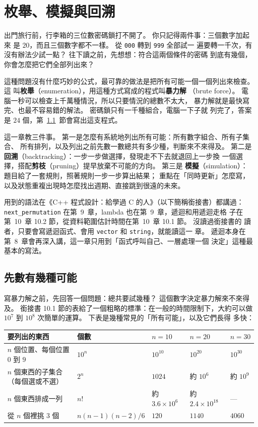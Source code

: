 \chapter{枚舉、模擬與回溯}
\label{ch:enumeration}

出門旅行前，行李箱的三位數密碼鎖打不開了。 你只記得兩件事：三個數字加起來
是 $20$，而且三個數字都不一樣。 從 \texttt{000} 轉到 \texttt{999} 全部試一
遍要轉一千次，有沒有辦法少試一點？ 往下讀之前，先想想：符合這兩個條件的密碼
到底有幾個，你會怎麼把它們全部列出來？

這種問題沒有什麼巧妙的公式，最可靠的做法是把所有可能一個一個列出來檢查。 這
叫\textbf{枚舉}（enumeration），用這種方式寫成的程式叫\textbf{暴力解}
（brute force）。 電腦一秒可以檢查上千萬種情況，所以只要情況的總數不太大，
暴力解就是最快寫完、也最不容易錯的解法。 密碼鎖只有一千種組合，電腦一下子就
列完了，答案是 $24$ 個，第~\ref{sec:count-cases}~節會寫出這支程式。

這一章教三件事。 第一是怎麼有系統地列出所有可能：所有數字組合、所有子集合、
所有排列，以及列出之前先數一數總共有多少種，判斷來不來得及。 第二是
\textbf{回溯}（backtracking）：一步一步做選擇，發現走不下去就退回上一步換
一個選擇，搭配\textbf{剪枝}（pruning）提早放棄不可能的方向。 第三是
\textbf{模擬}（simulation）：題目給了一套規則，照著規則一步一步算出結果；
重點在「同時更新」怎麼寫，以及狀態重複出現時怎麼找出週期、直接跳到很遠的未來。

用到的語法在《C++ 程式設計：給學過 C 的人》（以下簡稱銜接書）都講過：
\texttt{next\_permutation} 在第~9~章，lambda 也在第~9~章，遞迴和用遞迴走格
子在第~10~章 10.2 節，從資料範圍估計時間在第~10~章 10.1 節。 沒讀過銜接書的
讀者，只要會寫遞迴函式、會用 \texttt{vector} 和 \texttt{string}，就能讀這一
章。 遞迴本身在第~8~章會再深入講，這一章只用到「函式呼叫自己、一層處理一個
決定」這種最基本的寫法。

\section{先數有幾種可能}
\label{sec:count-cases}

寫暴力解之前，先回答一個問題：總共要試幾種？ 這個數字決定暴力解來不來得及。
銜接書 10.1 節的表給了一個粗略的標準：在一般的時間限制下，大約可以做
$10^7$ 到 $10^8$ 次簡單的運算。 下表是幾種常見的「所有可能」，以及它們長得
多快：

\begin{center}
\small
\begin{tabular}{lllll}
\toprule
要列出的東西 & 個數 & $n = 10$ & $n = 20$ & $n = 30$ \\
\midrule
$n$ 個位置、每個位置 $0$ 到 $9$ & $10^n$ & $10^{10}$ & $10^{20}$ & $10^{30}$ \\
$n$ 個東西的子集合（每個選或不選） & $2^n$ & $1024$ & 約 $10^6$ & 約 $10^9$ \\
$n$ 個東西排成一列 & $n!$ & 約 $3.6 \times 10^6$ & 約 $2.4 \times 10^{18}$ & --- \\
從 $n$ 個裡挑 $3$ 個 & $n(n-1)(n-2)/6$ & $120$ & $1140$ & $4060$ \\
\bottomrule
\end{tabular}
\end{center}

